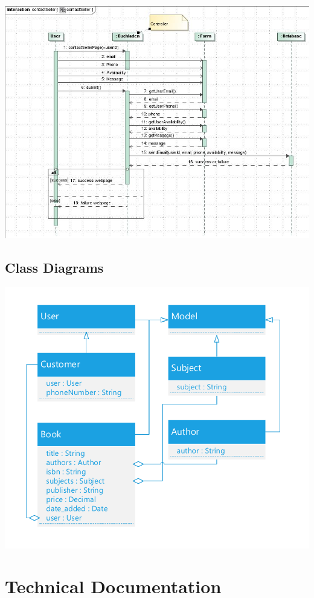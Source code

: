 \documentclass[11pt]{article}
\begin{document}
		\centerline{\includegraphics[scale=0.6]{./images/contactSellerSequence.JPG}}

\newpage                
\subsection{Class Diagrams}
\label{sec:class-diagrams}
\centerline{\includegraphics[scale=1]{./images/class-diagram.pdf}}

\newpage
\section{Technical Documentation}
\label{sec:technical-docs}
\end{document}
